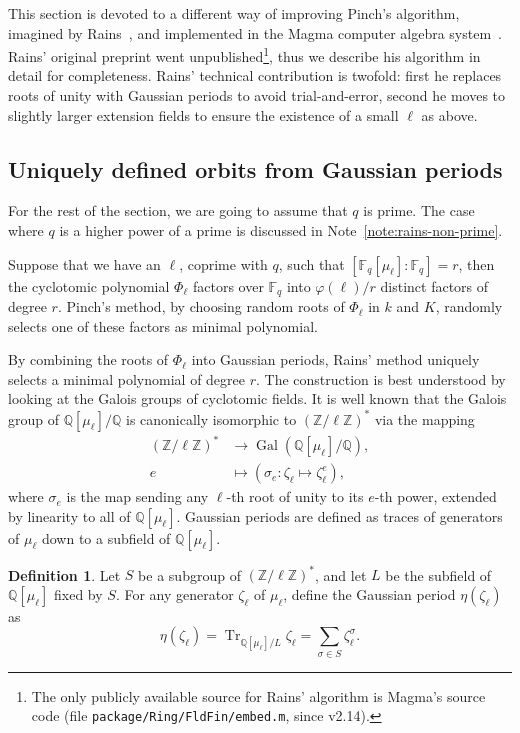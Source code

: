 \documentclass[12pt]{article}
\theoremstyle{plain}
\theoremstyle{definition}
\newtheorem{definition}[theorem]{Definition}
\DeclareMathOperator{\trace}{Tr} %
\DeclareMathOperator{\gal}{Gal} %
\def\Q{\ensuremath{\mathbb{Q}}}
\def\Z{\ensuremath{\mathbb{Z}}}
\def\F{\ensuremath{\mathbb{F}}}
\def\euler{\ensuremath{\varphi}}
\newcounter{algorithm}
\begin{document}
This section is devoted to a different way of improving Pinch's
algorithm, imagined by Rains~\cite{rains2008}, and implemented in the
Magma computer algebra system~\cite{MAGMA}. Rains' original preprint
went unpublished\footnote{The only publicly available source for
  Rains' algorithm is Magma's source code (file
  \texttt{package/Ring/FldFin/embed.m}, since v2.14).}, thus we
describe his algorithm in detail for completeness. Rains' technical
contribution is twofold: first he replaces roots of unity with
Gaussian periods to avoid trial-and-error, second he moves to slightly
larger extension fields to ensure the existence of a small $\ell$ as
above.

\subsection{Uniquely defined orbits from Gaussian periods}

For the rest of the section, we are going to assume that $q$ is
prime. The case where $q$ is a higher power of a prime is discussed in
Note~\ref{note:rains-non-prime}.

Suppose that we have an $\ell$, coprime with $q$, such that
$[\F_q[\mu_\ell]:\F_q]=r$, then the cyclotomic polynomial $\Phi_\ell$
factors over $\F_q$ into $\euler(\ell)/r$ distinct factors of degree
$r$. Pinch's method, by choosing random roots of $\Phi_\ell$ in $k$
and $K$, randomly selects one of these factors as minimal polynomial.

By combining the roots of $\Phi_\ell$ into Gaussian periods, Rains'
method uniquely selects a minimal polynomial of degree $r$. The
construction is best understood by looking at the Galois groups of
cyclotomic fields. It is well known that the Galois group of
$\Q[\mu_\ell]/\Q$ is canonically isomorphic to $(\Z/\ell\Z)^\ast$ via
the mapping
\begin{equation*}
  \begin{aligned}
    (\Z/\ell\Z)^\ast &\to \gal(\Q[\mu_\ell]/\Q),\\
    e &\mapsto (\sigma_e : \zeta_\ell\mapsto\zeta_\ell^e),
  \end{aligned}
\end{equation*}
where $\sigma_e$ is the map sending any $\ell$-th root of unity to its
$e$-th power, extended by linearity to all of $\Q[\mu_\ell]$. Gaussian
periods are defined as traces of generators of $\mu_\ell$ down to a
subfield of $\Q[\mu_\ell]$.

\begin{definition}
  Let $S$ be a subgroup of $(\Z/\ell\Z)^\ast$, and let $L$ be the
  subfield of $\Q[\mu_\ell]$ fixed by $S$. For any generator
  $\zeta_\ell$ of $\mu_\ell$, define the Gaussian period
  $\eta(\zeta_\ell)$ as
  \begin{equation}
    \eta(\zeta_\ell) = \trace_{\Q[\mu_\ell]/L} \zeta_\ell = \sum_{\sigma\in S}{\zeta_\ell^{\sigma}}.
  \end{equation}
\end{definition}
\end{document}

